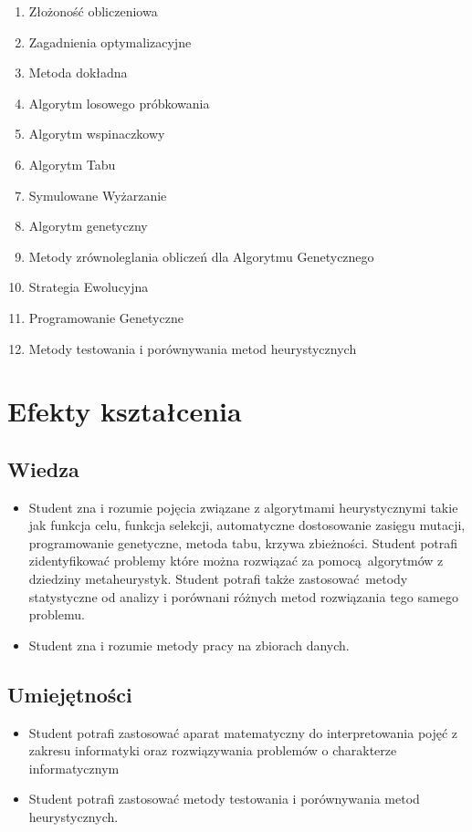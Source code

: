 \documentclass[12pt, a4paper]{article}
\begin{document}
\begin{enumerate}
  \item Złożoność obliczeniowa
  \item Zagadnienia optymalizacyjne
  \item Metoda dokładna
  \item Algorytm losowego próbkowania
  \item Algorytm wspinaczkowy
  \item Algorytm Tabu
  \item Symulowane Wyżarzanie
  \item Algorytm genetyczny
  \item Metody zrównoleglania obliczeń dla Algorytmu Genetycznego
  \item Strategia Ewolucyjna
  \item Programowanie Genetyczne
  \item Metody testowania i porównywania metod heurystycznych
\end{enumerate}

\section{Efekty kształcenia}

\subsection*{Wiedza}
\begin{itemize}
  \item Student zna i rozumie pojęcia związane z algorytmami heurystycznymi takie jak funkcja celu, funkcja selekcji, automatyczne dostosowanie zasięgu mutacji, programowanie genetyczne, metoda tabu, krzywa zbieżności. Student potrafi zidentyfikować problemy które można rozwiązać za pomocą algorytmów z dziedziny metaheurystyk. Student potrafi także zastosować metody statystyczne od analizy i porównani różnych metod rozwiązania tego samego problemu.
  \item Student zna i rozumie metody pracy na zbiorach danych.
\end{itemize}

\subsection*{Umiejętności}
\begin{itemize}
  \item Student potrafi zastosować aparat matematyczny do interpretowania pojęć z zakresu informatyki oraz rozwiązywania problemów o charakterze informatycznym
  \item Student potrafi  zastosować metody testowania i porównywania metod heurystycznych.
\end{itemize}
\end{document}
